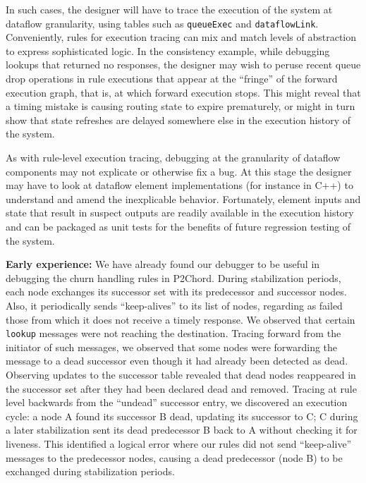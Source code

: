 \documentclass[10pt,twocolumn]{article}
\newcommand{\ol}[1]{{\tt\footnotesize#1}}
\begin{document}
In such cases, the designer will have to trace the execution of the
system at dataflow granularity, using tables such as \ol{queueExec} and
\ol{dataflowLink}.  Conveniently, rules for execution tracing can mix
and match levels of abstraction to express sophisticated logic.  In the
consistency example, while debugging lookups that returned no responses,
the designer may wish to peruse recent queue drop operations in rule
executions that appear at the ``fringe'' of the forward execution graph,
that is, at which forward execution stops.  This might reveal that a
timing mistake is causing routing state to expire prematurely, or might
in turn show that state refreshes are delayed somewhere else in the
execution history of the system.

As with rule-level execution tracing, debugging at the granularity of dataflow
components may not explicate or otherwise fix a bug.  At this stage the designer may have to look at
dataflow element implementations (for instance in C++)
to understand and amend the inexplicable behavior.
Fortunately, element inputs and state that result in suspect outputs are
readily available in the execution history and can be packaged as
unit tests for the benefits of future regression testing of the system.

{\bf Early experience:} 
We have already found our debugger to be useful in debugging the churn
handling rules in P2Chord.  
During stabilization periods, each node exchanges
its successor set with its predecessor and successor
nodes. Also, it periodically sends ``keep-alives'' to
its list of nodes, regarding as failed those from which it does not
receive a timely response. 
We observed that certain {\tt lookup} messages were not reaching the
destination. Tracing forward from the initiator of such messages, we
observed that some nodes were forwarding the message to a dead
successor even though it had already been detected as dead.  Observing
updates to the successor table revealed that dead nodes reappeared in the
successor set after they had been declared dead and removed. Tracing
at rule level backwards from the ``undead'' successor entry, we
discovered an execution cycle: a node A found its successor B
dead, updating its successor to C; C during a later stabilization sent
its dead predecessor B back to A without checking it for liveness.
This identified a logical
error where our rules did not send ``keep-alive'' messages to the
predecessor nodes, causing a dead predecessor (node B) to
be exchanged during stabilization periods. 
\end{document}
